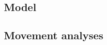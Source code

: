 \documentclass{article}
\begin{document}
\subsection{Model}

\subsection{Movement analyses}

\end{document}
